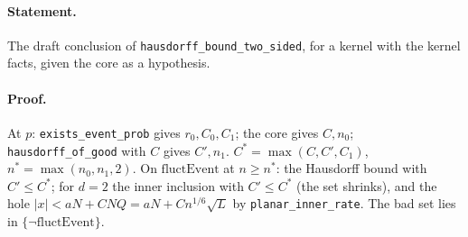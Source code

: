 \paragraph{Statement.} The draft conclusion of \texttt{hausdorff\_bound\_two\_sided}, for a kernel with the kernel facts, given the core as a hypothesis.
\paragraph{Proof.} At $p$: \texttt{exists\_event\_prob} gives $r_0,C_0,C_1$; the core gives $C,n_0$; \texttt{hausdorff\_of\_good} with $C$ gives $C',n_1$.
$C^*=\max(C,C',C_1)$, $n^*=\max(n_0,n_1,2)$. On $\mathrm{fluctEvent}$ at $n\geq n^*$: the Hausdorff bound with $C'\leq C^*$; for $d=2$ the inner inclusion with $C'\leq C^*$
(the set shrinks), and the hole $|x|<aN+CNQ=aN+Cn^{1/6}\sqrt L$ by \texttt{planar\_inner\_rate}. The bad set lies in $\{\neg\mathrm{fluctEvent}\}$.
